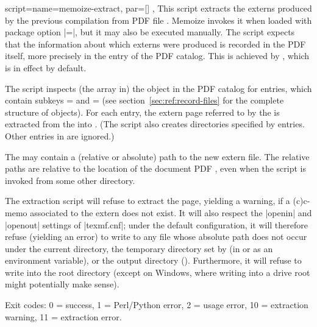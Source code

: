 \documentclass[a4paper,11pt]{article}
\begin{document}
\begin{doc}{
    script={name=memoize-extract, par=[] },
  }
  This script extracts the externs produced by the previous compilation from
  PDF file .  Memoize invokes it when loaded with package option
  |=|, but it may also be executed
  manually.  The script expects that the information about which externs were
  produced is recorded in the PDF itself, more precisely in the
   entry of the PDF catalog.  This is achieved by
  , which is in effect by default.

  The script inspects (the  array in) the
   object in the PDF catalog for
   entries, which contain subkeys
  = and = (see section~\ref{sec:ref:record-files} for the complete
  structure of  objects). For each
   entry, the extern page referred to by the
   is extracted from the  into .  (The script also creates directories specified by
   entries.  Other entries in 
  are ignored.)

  The  may contain a (relative or absolute) path to the
  new extern file.  The relative paths are relative to the location of the
  document PDF , even when the script is invoked from some other
  directory.

  The extraction script will refuse to extract the page, yielding a warning, if
  a (c)c-memo associated to the extern does not exist.  It will also respect
  the |openin| and |openout| settings of |texmf.cnf|; under the default
  configuration, it will therefore refuse (yielding an error) to write to any
  file whose absolute path does not occur under the current directory, the
  temporary directory set by  (in  or as
  an environment variable), or the output directory
  ().  Furthermore, it will refuse to write into
  the root directory (except on Windows, where writing into a drive root might
  potentially make sense).

  Exit codes: 0 = success, 1 = Perl/Python error, 2 = usage error, 10 =
  extraction warning, 11 = extraction error.
  

\end{doc}
\end{document}
